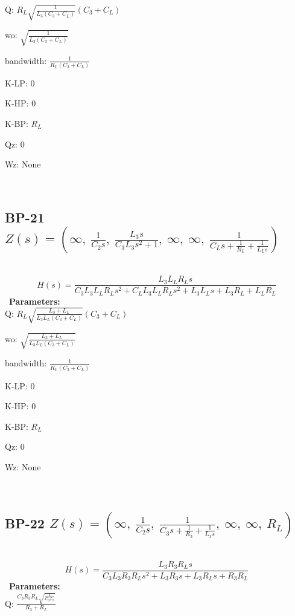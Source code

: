 \documentclass{article}
\begin{document}
Q: $R_{L} \sqrt{\frac{1}{L_{3} \left(C_{3} + C_{L}\right)}} \left(C_{3} + C_{L}\right)$\ 

wo: $\sqrt{\frac{1}{L_{3} \left(C_{3} + C_{L}\right)}}$\ 

bandwidth: $\frac{1}{R_{L} \left(C_{3} + C_{L}\right)}$\ 

K-LP: $0$\ 

K-HP: $0$\ 

K-BP: $R_{L}$\ 

Qz: $0$\ 

Wz: $\text{None}$\ 

\ 

\subsection{BP-21 $Z(s) = \left( \infty, \  \frac{1}{C_{2} s}, \  \frac{L_{3} s}{C_{3} L_{3} s^{2} + 1}, \  \infty, \  \infty, \  \frac{1}{C_{L} s + \frac{1}{R_{L}} + \frac{1}{L_{L} s}}\right)$ } \ 
\textbf{\[H(s) = \frac{L_{3} L_{L} R_{L} s}{C_{3} L_{3} L_{L} R_{L} s^{2} + C_{L} L_{3} L_{L} R_{L} s^{2} + L_{3} L_{L} s + L_{3} R_{L} + L_{L} R_{L}}\] } \ 
\textbf{Parameters:}\\ 

Q: $R_{L} \sqrt{\frac{L_{3} + L_{L}}{L_{3} L_{L} \left(C_{3} + C_{L}\right)}} \left(C_{3} + C_{L}\right)$\ 

wo: $\sqrt{\frac{L_{3} + L_{L}}{L_{3} L_{L} \left(C_{3} + C_{L}\right)}}$\ 

bandwidth: $\frac{1}{R_{L} \left(C_{3} + C_{L}\right)}$\ 

K-LP: $0$\ 

K-HP: $0$\ 

K-BP: $R_{L}$\ 

Qz: $0$\ 

Wz: $\text{None}$\ 

\ 

\subsection{BP-22 $Z(s) = \left( \infty, \  \frac{1}{C_{2} s}, \  \frac{1}{C_{3} s + \frac{1}{R_{3}} + \frac{1}{L_{3} s}}, \  \infty, \  \infty, \  R_{L}\right)$ } \ 
\textbf{\[H(s) = \frac{L_{3} R_{3} R_{L} s}{C_{3} L_{3} R_{3} R_{L} s^{2} + L_{3} R_{3} s + L_{3} R_{L} s + R_{3} R_{L}}\] } \ 
\textbf{Parameters:}\\ 

Q: $\frac{C_{3} R_{3} R_{L} \sqrt{\frac{1}{C_{3} L_{3}}}}{R_{3} + R_{L}}$\ 
\end{document}
